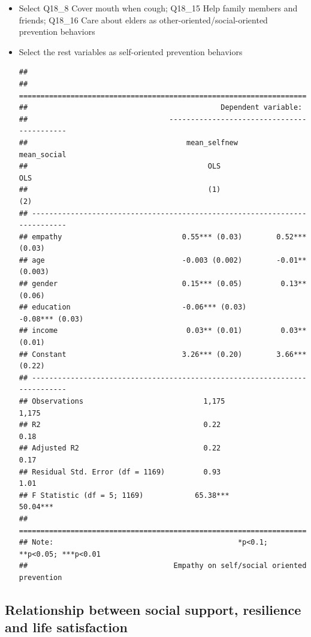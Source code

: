 \documentclass[
]{article}
\begin{document}
\begin{itemize}
\item
  Select Q18\_8 Cover mouth when cough; Q18\_15 Help family members and
  friends; Q18\_16 Care about elders as other-oriented/social-oriented
  prevention behaviors
\item
  Select the rest variables as self-oriented prevention behaviors

\begin{verbatim}
## 
## ===========================================================================
##                                             Dependent variable:            
##                                 -------------------------------------------
##                                     mean_selfnew           mean_social     
##                                          OLS                   OLS         
##                                          (1)                   (2)         
## ---------------------------------------------------------------------------
## empathy                            0.55*** (0.03)        0.52*** (0.03)    
## age                                -0.003 (0.002)        -0.01** (0.003)   
## gender                             0.15*** (0.05)         0.13** (0.06)    
## education                          -0.06*** (0.03)       -0.08*** (0.03)   
## income                              0.03** (0.01)         0.03** (0.01)    
## Constant                           3.26*** (0.20)        3.66*** (0.22)    
## ---------------------------------------------------------------------------
## Observations                            1,175                 1,175        
## R2                                      0.22                  0.18         
## Adjusted R2                             0.22                  0.17         
## Residual Std. Error (df = 1169)         0.93                  1.01         
## F Statistic (df = 5; 1169)            65.38***              50.04***       
## ===========================================================================
## Note:                                           *p<0.1; **p<0.05; ***p<0.01
##                                  Empathy on self/social oriented prevention
\end{verbatim}
\end{itemize}

\hypertarget{relationship-between-social-support-resilience-and-life-satisfaction}{%
\subsection{Relationship between social support, resilience and life
satisfaction}\label{relationship-between-social-support-resilience-and-life-satisfaction}}
\end{document}
